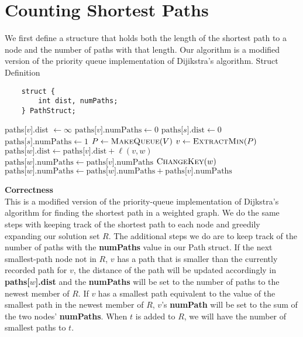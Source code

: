 \documentclass{article}
\begin{document}
\newpage
\section{Counting Shortest Paths}
We first define a structure that holds both the length of the shortest path to a node and the number of paths with that length. 
Our algorithm is a modified version of the priority queue implementation of Dijikstra's algorithm.
Struct Definition
\begin{lstlisting}
    struct {
        int dist, numPaths;
    } PathStruct;
\end{lstlisting}

\begin{algorithmic}
            \State paths[$v$].dist $\gets \infty$
            \State $\text{paths[\(v\)].numPaths} \gets 0$
        \EndFor
        \State $\text{paths[\(s\)].dist} \gets 0$
        \State $\text{paths[\(s\)].numPaths} \gets 1$
        \State $P \gets \Call{MakeQueue}{V}$  
            \State $v \gets \Call{ExtractMin}{P}$
                    \State $\text{paths[\(w\)].dist} \gets \text{paths[\(v\)].dist} + \ell(v, w)$
                    \State $\text{paths[\(w\)].numPaths} \gets  \text{paths[\(v\)].numPaths}$
                    \State $\Call{ChangeKey}{w}$
                    \State $\text{paths[\(w\)].numPaths} \gets \text{paths[\(w\)].numPaths} + \text{paths[\(v\)].numPaths}$
                \EndIf
            \EndFor
        \EndWhile

    \EndFunction
\end{algorithmic}

\textbf{Correctness} \\
This is a modified version of the priority-queue implementation of Dijkstra's algorithm for finding the shortest path in a weighted graph.
We do the same steps with keeping track of the shortest path to each node and greedily expanding our solution set $R$.
The additional steps we do are to keep track of the number of paths with the \textbf{numPaths} value in our Path struct.
If the next smallest-path node not in $R$, $v$ has a path that is smaller than the currently recorded path for $v$, the distance of the path will be updated accordingly
in \textbf{paths[$w$].dist} and the \textbf{numPaths} will be set to the number of paths to the newest member of $R$.
If $v$ has a smallest path equivalent to the value of the smallest path in the newest member of $R$, $v$'s \textbf{numPath} will be set
to the sum of the two nodes' \textbf{numPaths}. When $t$ is added to $R$, we will have the number of smallest paths to $t$.        \\
\end{document}
